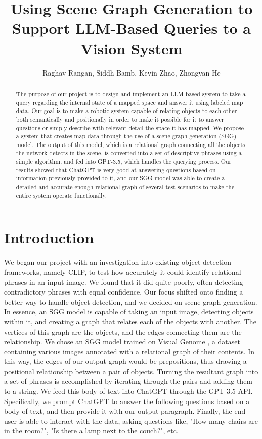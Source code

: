 \documentclass[letterpaper, 10 pt, conference]{ieeeconf}  %
\title{\LARGE \bf
Using Scene Graph Generation to Support LLM-Based Queries to a Vision System}
\author{Raghav Rangan, Siddh Bamb, Kevin Zhao, Zhongyan He%
}
\begin{document}
\maketitle
\thispagestyle{empty}
\pagestyle{empty}


\begin{abstract}
    The purpose of our project is to design and implement an LLM-based system to take a query regarding the internal state of a mapped space and answer it using labeled map data. Our goal is to make a robotic system capable of relating objects to each other both semantically and positionally in order to make it possible for it to answer questions or simply describe with relevant detail the space it has mapped. We propose a system that creates map data through the use of a scene graph generation (SGG) model. The output of this model, which is a relational graph connecting all the objects the network detects in the scene, is converted into a set of descriptive phrases using a simple algorithm, and fed into GPT-3.5, which handles the querying process. Our results showed that ChatGPT is very good at answering questions based on information previously provided to it, and our SGG model was able to create a detailed and accurate enough relational graph of several test scenarios to make the entire system operate functionally.
\end{abstract}
    
\section{Introduction}
    We began our project with an investigation into existing object detection frameworks, namely CLIP, to test how accurately it could identify relational phrases in an input image. We found that it did quite poorly, often detecting contradictory phrases with equal confidence. Our focus shifted onto finding a better way to handle object detection, and we decided on scene graph generation. In essence, an SGG model is capable of taking an input image, detecting objects within it, and creating a graph that relates each of the objects with another. The vertices of this graph are the objects, and the edges connecting them are the relationship. We chose an SGG model trained on Visual Genome \cite{Krishna_Zhu_Groth_Johnson_Hata_Kravitz_Chen_Kalantidis_Li_Shamma_et_al._2017}, a dataset containing various images annotated with a relational graph of their contents. In this way, the edges of our output graph would be prepositions, thus drawing a positional relationship between a pair of objects. Turning the resultant graph into a set of phrases is accomplished by iterating through the pairs and adding them to a string. We feed this body of text into ChatGPT through the GPT-3.5 API. Specifically, we prompt ChatGPT to answer the following questions based on a body of text, and then provide it with our output paragraph. Finally, the end user is able to interact with the data, asking questions like, "How many chairs are in the room?", "Is there a lamp next to the couch?", etc.
\end{document}
